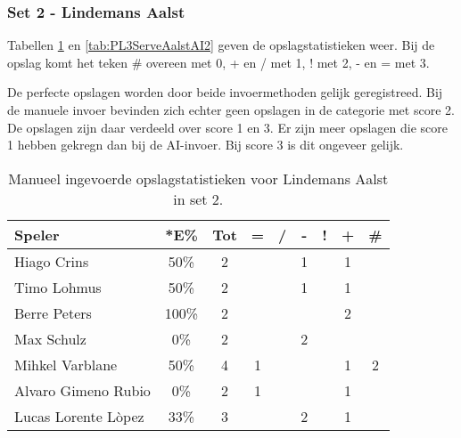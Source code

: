\subsubsection{Set 2 - Lindemans Aalst}
\label{sec:PL3_Aalst2}

Tabellen \ref{tab:PL3ServeAalstMan2} en \ref{tab:PL3ServeAalstAI2} geven de opslagstatistieken weer. Bij de opslag komt het teken \# overeen met 0, + en / met 1, ! met 2, - en = met 3.

De perfecte opslagen worden door beide invoermethoden gelijk geregistreed. Bij de manuele invoer bevinden zich echter geen opslagen in de categorie met score 2. De opslagen zijn daar verdeeld over score 1 en 3. Er zijn meer opslagen die score 1 hebben gekregn dan bij de AI-invoer. Bij score 3 is dit ongeveer gelijk.

\begin{table}[ht!]
    \centering
    \scriptsize
    \begin{tabular}{|l|c|c|c|c|c|c|c|c|}
        \hline
        \textbf{Speler} & *E\% & Tot & = & / & - & ! & + & \# \\ \hline
        Hiago Crins & 50\% & 2 &  &  & 1 &  & 1 &  \\
        Timo Lohmus & 50\% & 2 &  &  & 1 &  & 1 & \\ 
        Berre Peters & 100\% & 2 &  &  &  &  & 2 &\\ 
        Max Schulz & 0\% & 2 &  &  & 2 &  &  & \\ 
        Mihkel Varblane & 50\% & 4 & 1 &  &  & & 1 & 2 \\ 
        Alvaro Gimeno Rubio & 0\% & 2 & 1 &  &  &  & 1 &  \\ 
        Lucas Lorente Lòpez & 33\% & 3 &  &  & 2 &  & 1 & \\ \hline
    \end{tabular}
   \caption[Manueel ingevoerde opslagstatistieken voor Lindemans Aalst in set 2]{\label{tab:PL3ServeAalstMan2}Manueel ingevoerde opslagstatistieken voor Lindemans Aalst in set 2.}
\end{table}

